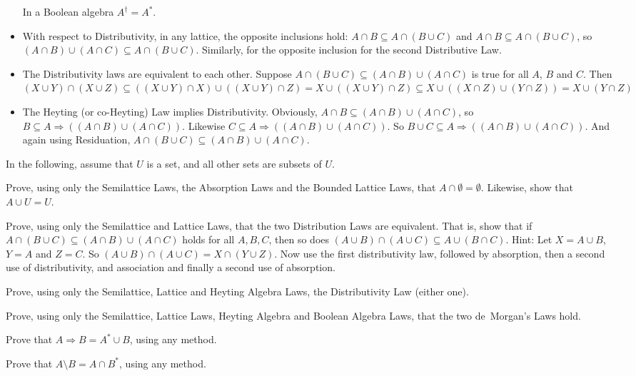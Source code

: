 \begin{itemize}
	In a Boolean algebra $A^\dagger= A^*$.
	\item With respect to Distributivity, in any lattice, the opposite inclusions hold: $A\cap B\subseteq A\cap(B\cup C)$ and $A\cap B\subseteq A\cap (B\cup C)$,
	so $(A\cap B)\cup (A\cap C)\subseteq A\cap (B\cup C)$. Similarly, for the opposite inclusion for the second Distributive Law.
	\item The Distributivity laws are equivalent to each other. Suppose $A\cap (B\cup C)\subseteq (A\cap B)\cup (A\cap C)$ is true for all $A$, $B$ and $C$. 
	Then $(X\cup Y)\cap (X\cup Z) \subseteq ((X\cup Y)\cap X)\cup ((X\cup Y)\cap Z) = X\cup ((X\cup Y)\cap Z)\subseteq X\cup ((X\cap Z)\cup (Y\cap Z)) = X\cup (Y\cap Z)$ 
	\item The Heyting (or co-Heyting) Law implies Distributivity. Obviously,
	$A\cap B\subseteq (A\cap B)\cup (A\cap C)$, so $B\subseteq A\Rightarrow ((A\cap B)\cup (A\cap C))$. 
	Likewise $C\subseteq A\Rightarrow ((A\cap B)\cup (A\cap C))$. 
	So $B\cup C\subseteq A\Rightarrow ((A\cap B)\cup (A\cap C))$. 
	And again using Residuation, $A\cap (B\cup C)\subseteq (A\cap B)\cup (A\cap C)$.
\end{itemize}


\begin{exercises}
	In the following, assume that $U$ is a set, and all other sets are subsets of $U$.
	\begin{nextexercise}
		\item Prove, using only the Semilattice Laws, the Absorption Laws and the Bounded Lattice Laws, that $A\cap \emptyset = \emptyset$. 
		Likewise, show that $A\cup U = U$.
		\item Prove, using only the Semilattice and Lattice Laws, that the two Distribution Laws are equivalent. That is, show that if $A\cap(B\cup C)\subseteq (A\cap B)\cup (A\cap C)$ holds for all $A,B,C$, then
		so does $(A\cup B)\cap (A\cup C)\subseteq A\cup(B\cap C)$. Hint: Let $X=A\cup B$, $Y= A$ and $Z=C$. So $(A\cup B)\cap(A\cup C) = X\cap (Y\cup Z)$. Now use the first distributivity law, followed by absorption, then a second use of distributivity, and association and finally a second use of absorption.
		\item Prove, using only the Semilattice, Lattice and Heyting Algebra Laws, the Distributivity Law (either one).
		\item Prove, using only the Semilattice, Lattice Laws, Heyting Algebra and Boolean Algebra Laws, that the two de~Morgan's Laws hold.
		\item Prove that $A\Rightarrow B = A^* \cup B$, using any method. 
		\item Prove that $A\setminus B = A\cap B^*$, using any method. 
	\end{nextexercise}
\end{exercises}

